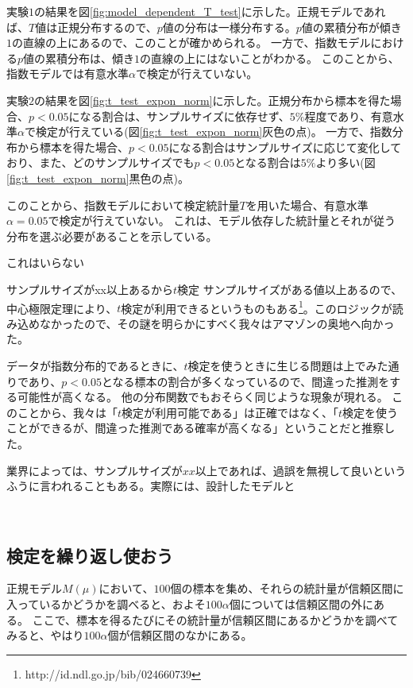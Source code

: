 実験$1$の結果を図\ref{fig:model_dependent_T_test}に示した。正規モデルであれば、$T$値は正規分布するので、$p$値の分布は一様分布する。$p$値の累積分布が傾き$1$の直線の上にあるので、このことが確かめられる。
一方で、指数モデルにおける$p$値の累積分布は、傾き$1$の直線の上にはないことがわかる。
このことから、指数モデルでは有意水準$\alpha$で検定が行えていない。

実験$2$の結果を図\ref{fig:t_test_expon_norm}に示した。正規分布から標本を得た場合、$p<0.05$になる割合は、サンプルサイズに依存せず、$5\%$程度であり、有意水準$\alpha$で検定が行えている(図\ref{fig:t_test_expon_norm}灰色の点)。
一方で、指数分布から標本を得た場合、$p<0.05$になる割合はサンプルサイズに応じて変化しており、また、どのサンプルサイズでも$p<0.05$となる割合は$5\%$より多い(図\ref{fig:t_test_expon_norm}黒色の点)。

このことから、指数モデルにおいて検定統計量$T$を用いた場合、有意水準$\alpha=0.05$で検定が行えていない。
これは、モデル依存した統計量とそれが従う分布を選ぶ必要があることを示している。

これはいらない
\begin{SMbox}{サンプルサイズがxx以上あるから$t$検定}
        サンプルサイズがある値以上あるので、中心極限定理により、$t$検定が利用できるというものもある\footnote{http://id.ndl.go.jp/bib/024660739}。このロジックが読み込めなかったので、その謎を明らかにすべく我々はアマゾンの奥地へ向かった。

        データが指数分布的であるときに、$t$検定を使うときに生じる問題は上でみた通りであり、$p<0.05$となる標本の割合が多くなっているので、間違った推測をする可能性が高くなる。
        他の分布関数でもおそらく同じような現象が現れる。
        このことから、我々は「$t$検定が利用可能である」は正確ではなく、「$t$検定を使うことができるが、間違った推測である確率が高くなる」ということだと推察した。

        業界によっては、サンプルサイズが$xx$以上であれば、過誤を無視して良いというふうに言われることもある。実際には、設計したモデルと
\end{SMbox}
\fi
　
\subsection{検定を繰り返し使おう}
正規モデル$M(\mu)$において、$100$個の標本を集め、それらの統計量が信頼区間に入っているかどうかを調べると、およそ$100\alpha$個については信頼区間の外にある。
ここで、標本を得るたびにその統計量が信頼区間にあるかどうかを調べてみると、やはり$100\alpha$個が信頼区間のなかにある。

